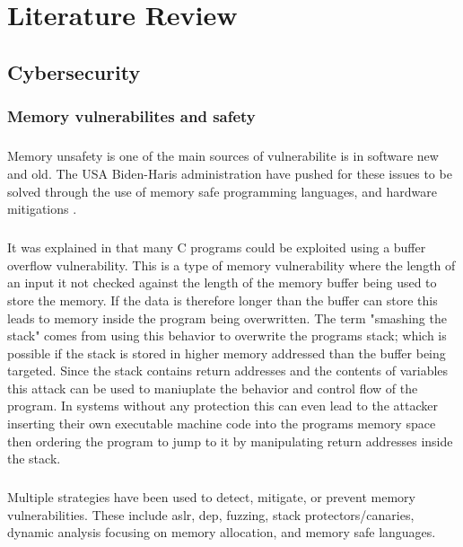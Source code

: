 \chapter{Literature Review}
\section{Cybersecurity}
\subsection{Memory vulnerabilites and safety}
\paragraph{}Memory unsafety is one of the main sources of vulnerabilite is in software new and old. The USA Biden-Haris administration have pushed for these issues to be solved through the use of memory safe programming languages, and hardware mitigations \autocite{noauthor_fact_2024}.

\paragraph{}It was explained in \cite{aleph_one_smashing_1996} that many C programs could be exploited using a buffer overflow vulnerability. This is a type of memory vulnerability where the length of an input it not checked against the length of the memory buffer being used to store the memory. If the data is therefore longer than the buffer can store this leads to memory inside the program being overwritten. The term "smashing the stack" comes from using this behavior to overwrite the programs stack; which is possible if the stack is stored in higher memory addressed than the buffer being targeted. Since the stack contains return addresses and the contents of variables this attack can be used to maniuplate the behavior and control flow of the program. In systems without any protection this can even lead to the attacker inserting their own executable machine code into the programs memory space then ordering the program to jump to it by manipulating return addresses inside the stack.

\paragraph{}Multiple strategies have been used to detect, mitigate, or prevent memory vulnerabilities. These include \acrshort{aslr}, \acrshort{dep}, fuzzing, stack protectors/canaries, dynamic analysis focusing on memory allocation, and memory safe languages.

